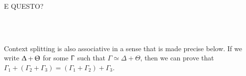 E QUESTO?
\begin{code}%
\>[0]\AgdaSpace{}%
\AgdaSymbol{:}\AgdaSpace{}%
\AgdaSpace{}%
\AgdaSymbol{\}}\AgdaSpace{}%
\AgdaSpace{}%
\AgdaSpace{}%
\AgdaOperator{\AgdaFunction{++}}\AgdaSpace{}%
\AgdaSpace{}%
\AgdaSpace{}%
\AgdaSpace{}%
\AgdaOperator{\AgdaDatatype{+}}\AgdaSpace{}%
\<%
\\
\>[0]\AgdaSpace{}%
\AgdaSymbol{\{}\AgdaInductiveConstructor{[]}\AgdaSymbol{\}}\AgdaSpace{}%
\AgdaSymbol{=}\AgdaSpace{}%
\<%
\\
\>[0]\AgdaSpace{}%
\AgdaSymbol{\{\AgdaUnderscore{}}\AgdaSpace{}%
\AgdaSpace{}%
\AgdaSymbol{\AgdaUnderscore{}\}}\AgdaSpace{}%
\AgdaSymbol{=}\AgdaSpace{}%
\AgdaSpace{}%
\<%
\end{code}

Context splitting is also associative in a sense that is made precise below. If
we write $\Updelta + \Uptheta$ for some $\Upgamma$ such that $Γ ≃ Δ + Θ$, then
we can prove that $Γ_1 + (Γ_2 + Γ_3) = (Γ_1 + Γ_2) + Γ_3$.

